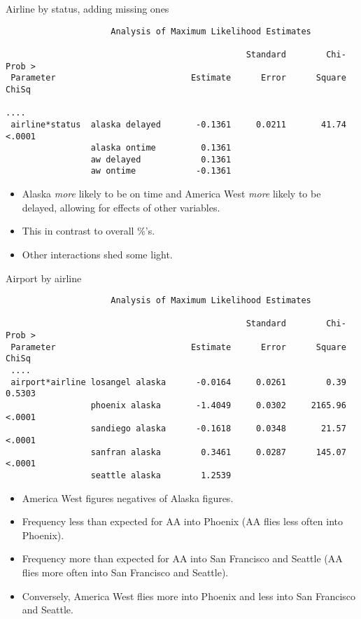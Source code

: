 \documentclass[pdf]{prosper}
\begin{document}
\begin{slide}{Airline by status, adding missing ones}

{\scriptsize
\begin{verbatim}
                     Analysis of Maximum Likelihood Estimates

                                                Standard        Chi-  Prob >
 Parameter                           Estimate      Error      Square   ChiSq

....
 airline*status  alaska delayed       -0.1361     0.0211       41.74  <.0001
                 alaska ontime         0.1361
                 aw delayed            0.1361
                 aw ontime            -0.1361         
\end{verbatim}
}

\begin{itemize}
\item Alaska {\em more} likely to be on time and America West {\em more} likely to be delayed, allowing for effects of other variables.
\item This in contrast to overall \%'s.
\item Other interactions shed some light.
\end{itemize}
  
\end{slide}

\begin{slide}{Airport by airline}

{\scriptsize
\begin{verbatim}
                     Analysis of Maximum Likelihood Estimates

                                                Standard        Chi-  Prob >
 Parameter                           Estimate      Error      Square   ChiSq
 ....
 airport*airline losangel alaska      -0.0164     0.0261        0.39  0.5303
                 phoenix alaska       -1.4049     0.0302     2165.96  <.0001
                 sandiego alaska      -0.1618     0.0348       21.57  <.0001
                 sanfran alaska        0.3461     0.0287      145.07  <.0001
                 seattle alaska        1.2539
\end{verbatim}
}

\begin{itemize}
\item America West figures negatives of Alaska figures.
\item Frequency less than expected for AA into Phoenix (AA flies less often into Phoenix).
\item Frequency more than expected for AA into San Francisco and Seattle (AA flies more often into San Francisco and Seattle).
\item Conversely, America West flies more into Phoenix and less into San Francisco and Seattle.
\end{itemize}
  
\end{slide}
\end{document}
